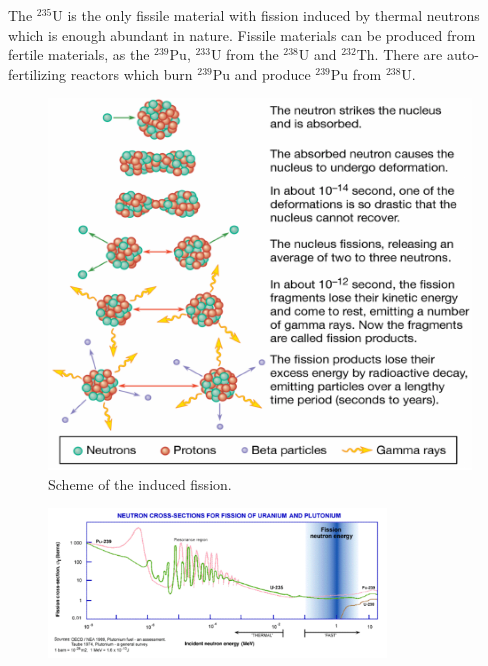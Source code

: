 The $^{235}\mbox{U}$ is the only fissile material with fission induced by thermal neutrons which is enough abundant in nature. Fissile materials can be produced from fertile materials, as the $^{239}\mbox{Pu}$, $^{233}\mbox{U}$ from the $^{238}\mbox{U}$ and $^{232}\mbox{Th}$. There are auto-fertilizing reactors which burn $^{239}\mbox{Pu}$ and produce $^{239}\mbox{Pu}$ from $^{238}\mbox{U}$.

\begin{figure}[h!]
    \centering
    \includegraphics[width=1\textwidth]{Figures/nuclear-physics3-fig4.pdf}
    \caption{Scheme of the induced fission.}
    \label{fig:nuclear-physics3-fig4}
\end{figure}

\begin{figure}
    \centering
    \includegraphics[width=0.8\textwidth]{Figures/nuclear-physics3-fig5.pdf}
    \caption{}
    \label{fig:nuclear-physics3-fig5}
\end{figure}

